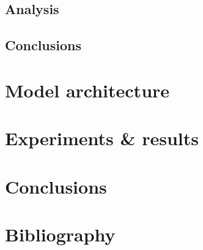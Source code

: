 \documentclass[11pt, a4paper]{article}
\begin{document}
	\subsection{Analysis}
	\subsection{Conclusions}
	
	\section{Model architecture}
	
	\section{Experiments \& results}
	\section{Conclusions}
	\section{Bibliography}

	
	
\end{document}

